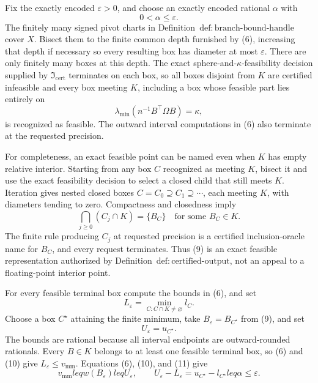 Fix the exactly encoded \(\varepsilon>0\), and choose an exactly encoded rational \(\alpha\) with
\[
 0<\alpha\leq\varepsilon. \tag{7}
\]
The finitely many signed pivot charts in Definition~\(\mathrm{def{:}branch\mbox{-}bound\mbox{-}handle}\) cover \(X\).  Bisect them to the finite common depth furnished by (6), increasing that depth if necessary so every resulting box has diameter at most \(\varepsilon\).  There are only finitely many boxes at this depth.  The exact sphere-and-\(\kappa\)-feasibility decision supplied by \(\mathfrak I_{\mathrm{cert}}\) terminates on each box, so all boxes disjoint from \(K\) are certified infeasible and every box meeting \(K\), including a box whose feasible part lies entirely on
\[
 \lambda_{\min}\!\left(n^{-1}B^{\top}\Omega B\right)=\kappa, \tag{8}
\]
is recognized as feasible.  The outward interval computations in (6) also terminate at the requested precision.

For completeness, an exact feasible point can be named even when \(K\) has empty relative interior.  Starting from any box \(C\) recognized as meeting \(K\), bisect it and use the exact feasibility decision to select a closed child that still meets \(K\).  Iteration gives nested closed boxes \(C=C_0\supseteq C_1\supseteq\cdots\), each meeting \(K\), with diameters tending to zero.  Compactness and closedness imply
\[
 \bigcap_{j\geq0}(C_j\cap K)=\{B_C\}
 \quad\text{for some }B_C\in K. \tag{9}
\]
The finite rule producing \(C_j\) at requested precision is a certified inclusion-oracle name for \(B_C\), and every request terminates.  Thus (9) is an exact feasible representation authorized by Definition~\(\mathrm{def{:}certified\mbox{-}output}\), not an appeal to a floating-point interior point.

For every feasible terminal box compute the bounds in (6), and set
\[
 L_\varepsilon=\min_{C:C\cap K\neq\varnothing}l_C. \tag{10}
\]
Choose a box \(C^\star\) attaining the finite minimum, take \(B_\varepsilon=B_{C^\star}\) from (9), and set
\[
 U_\varepsilon=u_{C^\star}. \tag{11}
\]
The bounds are rational because all interval endpoints are outward-rounded rationals.  Every \(B\in K\) belongs to at least one feasible terminal box, so (6) and (10) give \(L_\varepsilon\leq v_{\mathrm{mm}}\).  Equations (6), (10), and (11) give
\[
 v_{\mathrm{mm}}leq w(B_\varepsilon)leq U_\varepsilon,
 \qquad
 U_\varepsilon-L_\varepsilon
 =u_{C^\star}-l_{C^\star}leq\alpha\leq\varepsilon. \tag{12}
\]

